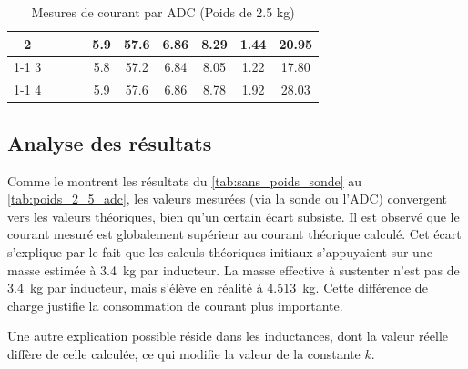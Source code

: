 \begin{table}[H]
{\begin{tabular}{|c|c|c|c|c|c|c|c|c|c|}
            2         &                                                            &                           &                                                                                        & 5.9                                                      & 57.6                                                    & 6.86                                                                & 8.29                                                  & 1.44   & 20.95                                                              \\ \cline{1-1} \cline{5-10}
            3         &                                                            &                           &                                                                                        & 5.8                                                      & 57.2                                                    & 6.84                                                                & 8.05                                                  & 1.22   & 17.80                                                              \\ \cline{1-1} \cline{5-10}
            4         &                                                            &                           &                                                                                        & 5.9                                                      & 57.6                                                    & 6.86                                                                & 8.78                                                  & 1.92   & 28.03                                                              \\ \hline
        \end{tabular}%
    }
    \caption{Mesures de courant par ADC (Poids de 2.5 kg)}
    \label{tab:poids_2_5_adc}
\end{table}

\subsection{Analyse des résultats}
Comme le montrent les résultats du \autoref{tab:sans_poids_sonde} au \autoref{tab:poids_2_5_adc}, les valeurs mesurées (via la sonde ou l'ADC) convergent vers les valeurs théoriques, bien qu'un certain écart subsiste. Il est observé que le courant mesuré est globalement supérieur au courant théorique calculé. Cet écart s'explique par le fait que les calculs théoriques initiaux s'appuyaient sur une masse estimée à 3.4~kg par inducteur. La masse effective à sustenter n'est pas de 3.4~kg par inducteur, mais s'élève en réalité à 4.513~kg. Cette différence de charge justifie la consommation de courant plus importante.

Une autre explication possible réside dans les inductances, dont la valeur réelle diffère de celle calculée, ce qui modifie la valeur de la constante $k$.